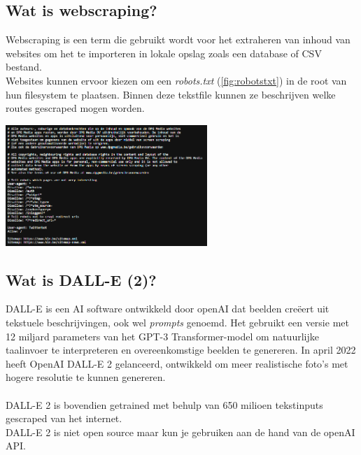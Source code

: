 \subsection{Wat is webscraping?} 
\noindent
Webscraping is een term die gebruikt wordt voor het extraheren van inhoud van websites om het te importeren in lokale opslag zoals een database of CSV bestand.  \autocite{Salem2020} \\
\noindent
Websites kunnen ervoor kiezen om een \emph{robots.txt} (\ref{fig:robotstxt}) in de root van hun filesystem te plaatsen. Binnen deze tekstfile kunnen ze beschrijven welke routes gescraped mogen worden. \autocite{GoogleDocs} \\
\begin{center}
    \includegraphics[width = 3in]{robotstxt_hln.png}
    \label{fig:robotstxt}
\end{center}

\subsection{Wat is DALL-E (2)?}

\noindent
DALL-E is een AI software ontwikkeld door openAI dat beelden creëert uit tekstuele beschrijvingen, ook wel \emph{prompts} genoemd. Het gebruikt een versie met 12 miljard parameters van het GPT-3 Transformer-model om natuurlijke taalinvoer te interpreteren en overeenkomstige beelden te genereren. In april 2022 heeft OpenAI DALL-E 2 gelanceerd, ontwikkeld om meer realistische foto's met hogere resolutie te kunnen genereren. \\
 \autocite{DallEWikipediaNL}  \autocite{DallEWikipediaEN}\\

\noindent
DALL-E 2 is bovendien getrained met behulp van 650 milioen tekstinputs gescraped van het internet. \autocite{Borji2022} \\

\noindent
DALL-E 2 is niet open source maar kun je gebruiken aan de hand van de openAI API.  \\
